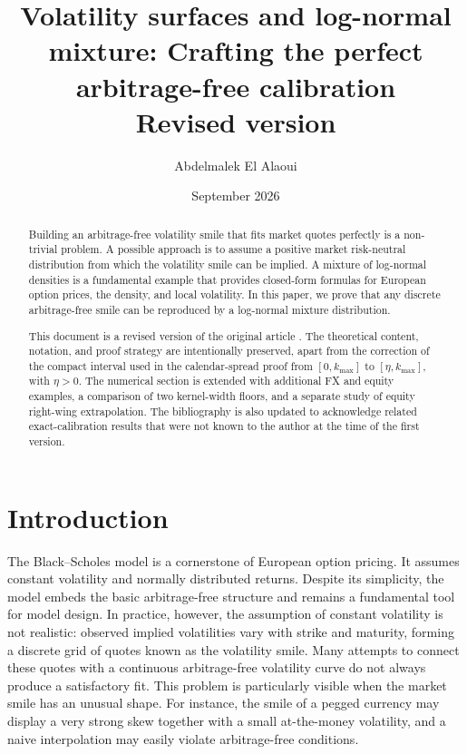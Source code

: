 \documentclass[11pt]{article}
\title{\textbf{Volatility surfaces and log-normal mixture: Crafting the perfect\\
arbitrage-free calibration}\\[0.35em]\large Revised version}
\author{Abdelmalek El Alaoui}
\date{September 2026}
\begin{document}
\maketitle

\begin{abstract}
Building an arbitrage-free volatility smile that fits market quotes perfectly is a non-trivial problem. A possible approach is to assume a positive market risk-neutral distribution from which the volatility smile can be implied. A mixture of log-normal densities is a fundamental example that provides closed-form formulas for European option prices, the density, and local volatility. In this paper, we prove that any discrete arbitrage-free smile can be reproduced by a log-normal mixture distribution.

This document is a revised version of the original article \cite{elalaoui2023}. The theoretical content, notation, and proof strategy are intentionally preserved, apart from the correction of the compact interval used in the calendar-spread proof from $[0,k_{\max}]$ to $[\eta,k_{\max}]$, with $\eta>0$. The numerical section is extended with additional FX and equity examples, a comparison of two kernel-width floors, and a separate study of equity right-wing extrapolation. The bibliography is also updated to acknowledge related exact-calibration results that were not known to the author at the time of the first version.
\end{abstract}

\section{Introduction}
The Black--Scholes model \cite{blackscholes} is a cornerstone of European option pricing. It assumes constant volatility and normally distributed returns. Despite its simplicity, the model embeds the basic arbitrage-free structure and remains a fundamental tool for model design. In practice, however, the assumption of constant volatility is not realistic: observed implied volatilities vary with strike and maturity, forming a discrete grid of quotes known as the volatility smile. Many attempts to connect these quotes with a continuous arbitrage-free volatility curve do not always produce a satisfactory fit. This problem is particularly visible when the market smile has an unusual shape. For instance, the smile of a pegged currency may display a very strong skew together with a small at-the-money volatility, and a naive interpolation may easily violate arbitrage-free conditions.
\end{document}
